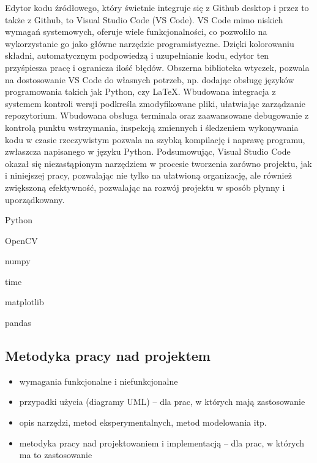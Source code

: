 \documentclass[a4paper,twoside,12pt]{book}
\begin{document}
Edytor kodu źródłowego, który świetnie integruje się z Github desktop i przez to także z Github, to Visual Studio Code (VS Code).  VS Code mimo niskich wymagań systemowych, oferuje wiele funkcjonalności, co pozwoliło na wykorzystanie go jako główne narzędzie programistyczne. Dzięki kolorowaniu składni, automatycznym podpowiedzą i uzupełnianie kodu, edytor ten przyśpiesza pracę i ogranicza ilość błędów. Obszerna biblioteka wtyczek, pozwala na dostosowanie VS Code do własnych potrzeb, np. dodając obsługę języków programowania takich jak Python, czy \LaTeX. Wbudowana integracja z systemem kontroli wersji podkreśla zmodyfikowane pliki, ułatwiając zarządzanie repozytorium. Wbudowana obsługa terminala oraz zaawansowane debugowanie z kontrolą punktu wstrzymania, inspekcją zmiennych i śledzeniem wykonywania kodu w czasie rzeczywistym pozwala na szybką kompilację i naprawę programu, zwłaszcza napisanego w języku Python. Podsumowując, Visual Studio Code okazał się niezastąpionym narzędziem w procesie tworzenia zarówno projektu, jak i niniejszej pracy, pozwalając nie tylko na ułatwioną organizację, ale również zwiększoną efektywność, pozwalając na rozwój projektu w sposób płynny i uporządkowany.

Python

OpenCV

numpy

time

matplotlib

pandas

\subsection{Metodyka pracy nad projektem}


\begin{itemize}
\item wymagania funkcjonalne i niefunkcjonalne
\item przypadki użycia (diagramy UML) -- dla prac, w których mają zastosowanie
\item opis narzędzi, metod eksperymentalnych, metod modelowania itp.
\item metodyka pracy nad projektowaniem i implementacją -- dla prac, w których ma to zastosowanie
\end{itemize}


%
%
%
\end{document}
